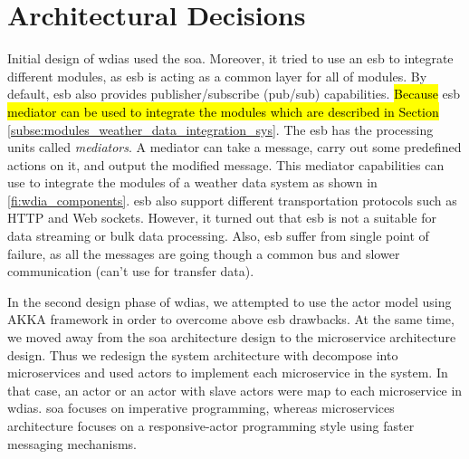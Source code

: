 \section{Architectural Decisions}
\label{se:architectural_decisions}

Initial design of \acrshort{wdias} used the \acrfull{soa}. Moreover, it tried to use an \acrfull{esb} to integrate different modules, as \acrshort{esb} is acting as a common layer for all of modules. By default, \acrshort{esb} also provides publisher/subscribe (pub/sub) capabilities.
\hl{Because} \acrshort{esb} \hl{mediator can be used to integrate the modules which are described in Section} \ref{subse:modules_weather_data_integration_sys}. 
The \acrshort{esb} has the processing units called \emph{mediators}. A mediator can take a message, carry out some predefined actions on it, and output the modified message. This mediator capabilities can use to integrate the modules of a weather data system as shown in \cref{fi:wdia_components}. \acrshort{esb} also support different transportation protocols such as HTTP and Web sockets. However, it turned out that \acrshort{esb} is not a suitable for data streaming or bulk data processing. Also, \acrshort{esb} suffer from single point of failure, as all the messages are going though a common bus and slower communication (can’t use for transfer data).

In the second design phase of \acrshort{wdias}, we attempted to use the actor model using AKKA framework \cite{HewittWhyModel} in order to overcome above \acrshort{esb} drawbacks. At the same time, we moved away from the \acrshort{soa} architecture design to the microservice architecture design. Thus we redesign the system architecture with decompose into microservices and used actors to implement each microservice in the system. In that case, an actor or an actor with slave actors were map to each microservice in \acrshort{wdias}. \acrshort{soa} focuses on imperative programming, whereas microservices architecture focuses on a responsive-actor programming style using faster messaging mechanisms. 

